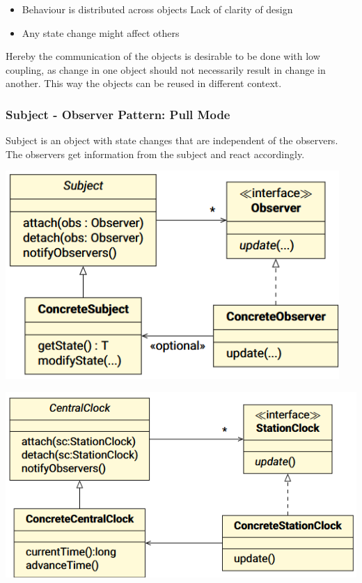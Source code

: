 \documentclass[
    ../../Software_Engineering_Summary.tex,
]
{subfiles}
\begin{document}
\begin{itemize}
    \item Behaviour is distributed across objects \rightarrow Lack of clarity of design
    \item Any state change might affect others
\end{itemize}

Hereby the communication of the objects is desirable to be done with low coupling, as change in one object should not necessarily result in change in another. This way the objects can be reused in different context.

\subsubsection{Subject - Observer Pattern: Pull Mode}
Subject is an object with state changes that are independent of the observers. The observers get information from the subject and react accordingly.

\begin{minipage}
    [t]{0.5\textwidth}
    \centering
    \includegraphics[width=0.95\textwidth]{Pics/09/ObserverPattern.png}
\end{minipage}
\hfill
\begin{minipage}
    [t]{0.5\textwidth}
    \centering
    \includegraphics[width=\textwidth]{Pics/09/ObserverPatternExample.png}
\end{minipage}
\end{document}
